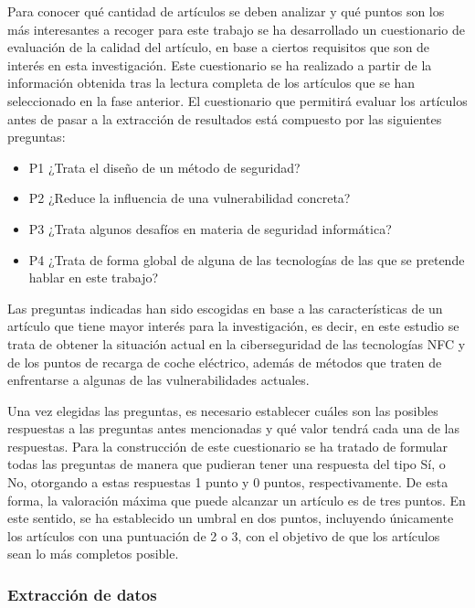 \documentclass[12pt,a4paper,onecolumn,oneside]{report}
\begin{document}
Para conocer qué cantidad de artículos se deben analizar y qué puntos son los más interesantes a recoger para este trabajo se ha desarrollado un cuestionario de evaluación de la calidad del artículo, en base a ciertos requisitos que son de interés en esta investigación. Este cuestionario se ha realizado a partir de la información obtenida tras la lectura completa de los artículos que se han seleccionado en la fase anterior. El cuestionario que permitirá evaluar los artículos antes de pasar a la extracción de resultados está compuesto por las siguientes preguntas:

\begin{itemize}
\item P1 ¿Trata el diseño de un método de seguridad?
\item P2 ¿Reduce la influencia de una vulnerabilidad concreta?
\item P3 ¿Trata algunos desafíos en materia de seguridad informática?
\item P4 ¿Trata de forma global de alguna de las tecnologías de las que se pretende hablar en este trabajo?
\end{itemize}

Las preguntas indicadas han sido escogidas en base a las características de un artículo que tiene mayor interés para la investigación, es decir, en este estudio se trata de obtener la situación actual en la ciberseguridad de las tecnologías NFC y de los puntos de recarga de coche eléctrico, además de métodos que traten de enfrentarse a algunas de las vulnerabilidades actuales.

Una vez elegidas las preguntas, es necesario establecer cuáles son las posibles respuestas a las preguntas antes mencionadas y qué valor tendrá cada una de las respuestas. Para la construcción de este cuestionario se ha tratado de formular todas las preguntas de manera que pudieran tener una respuesta del tipo Sí, o No, otorgando a estas respuestas 1 punto y 0 puntos, respectivamente. De esta forma, la valoración máxima que puede alcanzar un artículo es de tres puntos. En este sentido, se ha establecido un umbral en dos puntos, incluyendo únicamente los artículos con una puntuación de 2 o 3, con el objetivo de que los artículos sean lo más completos posible. 


\subsubsection{Extracción de datos}
\end{document}

